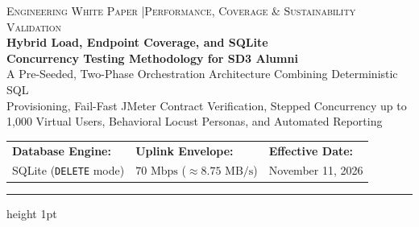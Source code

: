 \documentclass[11pt,letterpaper]{article}
\begin{document}
\thispagestyle{empty}
\begin{tcolorbox}[
  colback=NavyPrimary,
  colframe=NavyPrimary,
  arc=4pt,
  left=16pt,
  right=16pt,
  top=18pt,
  bottom=18pt
]
  {\color{RuleGray}\small\textsc{Engineering White Paper \quad|\quad Performance, Coverage \& Sustainability Validation}}\\[6pt]
  {\color{white}\LARGE\bfseries Hybrid Load, Endpoint Coverage, and SQLite\\Concurrency Testing Methodology for SD3 Alumni}\\[10pt]
  {\color{RuleGray}\normalsize
  A Pre-Seeded, Two-Phase Orchestration Architecture Combining Deterministic SQL\\
  Provisioning, Fail-Fast JMeter Contract Verification, Stepped Concurrency up to\\
  1,000 Virtual Users, Behavioral Locust Personas, and Automated Reporting}
\end{tcolorbox}

\vspace{6pt}
\begin{center}
\renewcommand{\arraystretch}{1.3}
\begin{tabularx}{0.9\textwidth}{
    @{} >{\raggedright\arraybackslash}X
        >{\raggedright\arraybackslash}X
        >{\raggedright\arraybackslash}X @{}
}
    \textbf{Database Engine:} &
    \textbf{Uplink Envelope:} &
    \textbf{Effective Date:} \\

    SQLite (\texttt{DELETE} mode) &
    $70\text{ Mbps}$ ($\approx 8.75\text{ MB/s}$) &
    November 11, 2026
\end{tabularx}
\end{center}
\vspace{8pt}
{\color{RuleGray}\hrule height 1pt}
\vspace{10pt}
\end{document}
